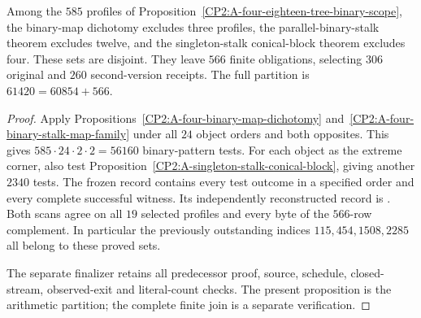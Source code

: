 \begin{proposition}
\label{CP2:A-four-eighteen-final-binary-conical-scope}
Among the $585$ profiles of
Proposition~\ref{CP2:A-four-eighteen-tree-binary-scope},
the binary-map dichotomy excludes three profiles,
the parallel-binary-stalk theorem excludes twelve,
and the singleton-stalk conical-block theorem excludes
four. These sets are disjoint. They leave $566$ finite
obligations, selecting $306$ original and $260$
second-version receipts. The full partition is
$61420=60854+566$.
\end{proposition}
\begin{proof}
Apply Propositions~\ref{CP2:A-four-binary-map-dichotomy}
and~\ref{CP2:A-four-binary-stalk-map-family} under all
$24$ object orders and both opposites. This gives
$585\cdot24\cdot2\cdot2=56160$ binary-pattern tests.
For each object as the extreme corner, also test
Proposition~\ref{CP2:A-singleton-stalk-conical-block},
giving another $2340$ tests. The frozen record
contains every test outcome in a specified order and
every complete successful witness. Its independently
reconstructed record is
.
Both scans agree on all $19$ selected profiles and every
byte of the $566$-row complement. In particular the
previously outstanding indices $115,454,1508,2285$
all belong to these proved sets.

The separate finalizer
retains all predecessor proof, source, schedule,
closed-stream, observed-exit and literal-count checks.
The present proposition is the arithmetic partition;
the complete finite join is a separate verification.
\end{proof}
